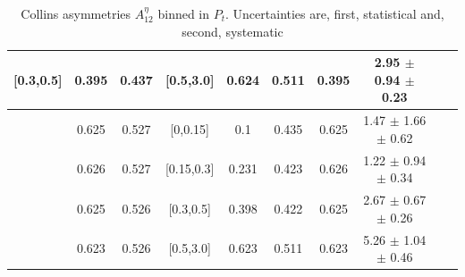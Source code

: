 \documentclass[aps,prX,preprint,groupedaddress,linenumbers]{revtex4-1}
\begin{document}
\begin{table}[H]
\begin{tabular}{|c| c| c| c| c| c| c| c| c| c|}
[0.3,0.5]	&	0.395	&	0.437	&	[0.5,3.0]	&	0.624	&	0.511	&	0.395	&2.95  $\pm$ 0.94  $\pm$ 0.23  	\\ \hline
\hline
[0.5,3.0]	&	0.625	&	0.527	&	[0,0.15]	&	0.1	        &	0.435	&0.625	&1.47  $\pm$ 1.66  $\pm$ 0.62  	\\ \hline
[0.5,3.0]	&	0.626	&	0.527	&	[0.15,0.3]	&	0.231	&	0.423	&	0.626	&1.22  $\pm$ 0.94  $\pm$ 0.34  	\\ \hline
[0.5,3.0]	&	0.625	&	0.526	&	[0.3,0.5]	&	0.398	&	0.422	&	0.625	&2.67  $\pm$ 0.67  $\pm$ 0.26  	\\ \hline
[0.5,3.0]	&	0.623	&	0.526	&	[0.5,3.0]	&	0.623	&	0.511	&	0.623	&5.26  $\pm$ 1.04  $\pm$ 0.46  	\\ \hline
\end{tabular}
\caption[Collins asymmetries $A_{12}^{\eta}$ binned in $P_t$]{Collins asymmetries $A_{12}^{\eta}$ binned in $P_t$. Uncertainties are, first, statistical and, second, systematic}
\label{tab:finaletaptbin}
\end{table}
\end{document}
